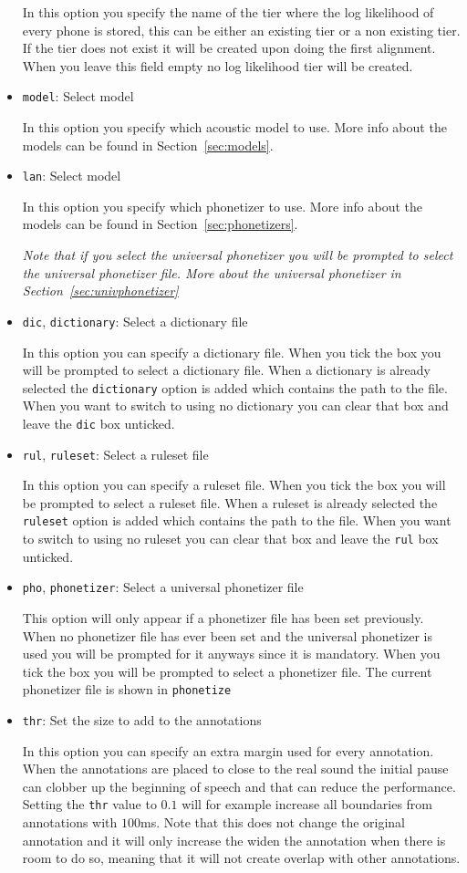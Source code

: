 \begin{itemize}
		In this option you specify the name of the tier where the log likelihood of
		every phone is stored, this can be either an existing tier or a non
		existing tier. If the tier does not exist it will be created upon doing the
		first alignment. When you leave this field empty no log likelihood tier
		will be created.
	\item \texttt{model}: %
		Select model

		In this option you specify which acoustic model to use. More info about the
		models can be found in Section~\ref{sec:models}.
	\item \texttt{lan}: %
		Select model

		In this option you specify which phonetizer to use. More info about the
		models can be found in Section~\ref{sec:phonetizers}.

		\emph{Note that if you select the universal phonetizer you will be prompted
		to select the universal phonetizer file. More about the universal
		phonetizer in Section~\ref{sec:univphonetizer}}
	\item \texttt{dic}, \texttt{dictionary}: %
		Select a dictionary file

		In this option you can specify a dictionary file. When you tick the box you
		will be prompted to select a dictionary file. When a dictionary is already
		selected the \texttt{dictionary} option is added which contains the path to
		the file. When you want to switch to using no dictionary you can clear that
		box and leave the \texttt{dic} box unticked.
	\item \texttt{rul}, \texttt{ruleset}: %
		Select a ruleset file

		In this option you can specify a ruleset file. When you tick the box you
		will be prompted to select a ruleset file. When a ruleset is already
		selected the \texttt{ruleset} option is added which contains the path to
		the file. When you want to switch to using no ruleset you can clear that
		box and leave the \texttt{rul} box unticked.
	\item \texttt{pho}, \texttt{phonetizer}: %
		Select a universal phonetizer file

		This option will only appear if a phonetizer file has been set
		previously. When no phonetizer file has ever been set and the universal
		phonetizer is used you will be prompted for it anyways since it is
		mandatory. When you tick the box you
		will be prompted to select a phonetizer file. The current phonetizer
		file is shown in \texttt{phonetize}
	\item \texttt{thr}: %
		Set the size to add to the annotations

		In this option you can specify an extra margin used for every annotation.
		When the annotations are placed to close to the real sound the initial
		pause can clobber up the beginning of speech and that can reduce the
		performance. Setting the \texttt{thr} value to $0.1$ will for example increase
		all boundaries from annotations with $100$ms. Note that this does not
		change the original annotation and it will only increase the widen the
		annotation when there is room to do so, meaning that it will not create
		overlap with other annotations.
\end{itemize}

